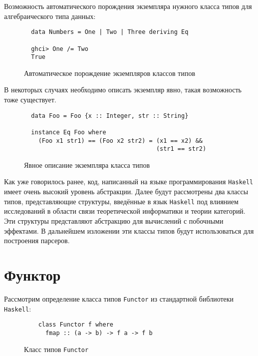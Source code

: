   Возможность автоматического порождения экземпляра нужного класса типов для
  алгебраического типа данных:
  \begin{figure}[h]
  \begin{lstlisting}
  data Numbers = One | Two | Three deriving Eq

  ghci> One /= Two
  True
  \end{lstlisting}
  \caption{Автоматическое порождение экземпляров классов типов}
  \label{listing:List}
  \end{figure}


  В некоторых случаях необходимо описать экземпляр явно, такая возможность тоже
  существует.

  \begin{figure}[h]
  \begin{lstlisting}
  data Foo = Foo {x :: Integer, str :: String}

  instance Eq Foo where
    (Foo x1 str1) == (Foo x2 str2) = (x1 == x2) &&
                                     (str1 == str2)
  \end{lstlisting}
  \caption{Явное описание экземпляра класса типов}
  \label{listing:Instance}
  \end{figure}

  Как уже говорилось ранее, код, написанный на языке программирования
  \lstinline{Haskell} имеет очень высокий уровень абстракции. Далее будут
  рассмотрены два классы типов, представляющие структуры, введённые в язык
  \lstinline{Haskell} под влиянием исследований в области связи теоретической
  информатики и теории категорий. Эти структуры представляют абстракцию для
  вычислений с побочными эффектами. В дальнейшем изложении эти классы типов будут
  использоваться для построения парсеров.

\section{Функтор}

  Рассмотрим определение класса типов \lstinline{Functor} из стандартной
  библиотеки \lstinline{Haskell}:

  \begin{figure}[h]
  \begin{lstlisting}
    class Functor f where
      fmap :: (a -> b) -> f a -> f b
  \end{lstlisting}
  \caption{Класс типов \lstinline{Functor}}
  \label{listing:Functor}
  \end{figure}


